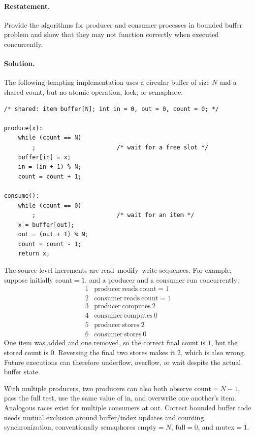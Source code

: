 \paragraph{Restatement.}
Provide the algorithms for producer and consumer processes in bounded
buffer problem and show that they may not function correctly when
executed concurrently.

\paragraph{Solution.}
The following tempting implementation uses a circular buffer of size
\(N\) and a shared count, but no atomic operation, lock, or semaphore:

\begin{verbatim}
/* shared: item buffer[N]; int in = 0, out = 0, count = 0; */

produce(x):
    while (count == N)
        ;                       /* wait for a free slot */
    buffer[in] = x;
    in = (in + 1) % N;
    count = count + 1;

consume():
    while (count == 0)
        ;                       /* wait for an item */
    x = buffer[out];
    out = (out + 1) % N;
    count = count - 1;
    return x;
\end{verbatim}

The source-level increments are read--modify--write sequences.  For
example, suppose initially \(\mathrm{count}=1\), and a producer and a
consumer run concurrently:
\[
\begin{array}{c|l}
1&\mathrm{producer\ reads\ count}=1\\
2&\mathrm{consumer\ reads\ count}=1\\
3&\mathrm{producer\ computes}\ 2\\
4&\mathrm{consumer\ computes}\ 0\\
5&\mathrm{producer\ stores}\ 2\\
6&\mathrm{consumer\ stores}\ 0
\end{array}
\]
One item was added and one removed, so the correct final count is
\(1\), but the stored count is \(0\).  Reversing the final two stores
makes it \(2\), which is also wrong.  Future executions can therefore
underflow, overflow, or wait despite the actual buffer state.

With multiple producers, two producers can also both observe
\(\mathrm{count}=N-1\), pass the full test, use the same value of
\(\mathrm{in}\), and overwrite one another's item.  Analogous races
exist for multiple consumers at \(\mathrm{out}\).  Correct bounded
buffer code needs mutual exclusion around buffer/index updates and
counting synchronization, conventionally semaphores
\(\mathrm{empty}=N\), \(\mathrm{full}=0\), and
\(\mathrm{mutex}=1\).

